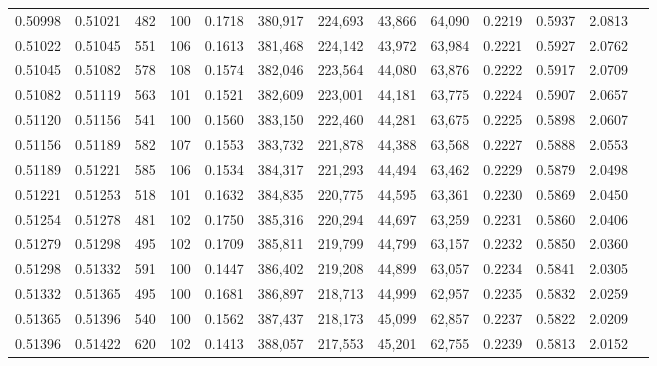 \begin{tabular}{rrrrrrrrrrrrr}
0.50998 & 0.51021 &   482 & 100 &                                     0.1718 & 380,917 & 224,693 &  43,866 &  64,090 & 0.2219 & 0.5937 & 2.0813 \\
0.51022 & 0.51045 &   551 & 106 &                                     0.1613 & 381,468 & 224,142 &  43,972 &  63,984 & 0.2221 & 0.5927 & 2.0762 \\
0.51045 & 0.51082 &   578 & 108 &                                     0.1574 & 382,046 & 223,564 &  44,080 &  63,876 & 0.2222 & 0.5917 & 2.0709 \\
0.51082 & 0.51119 &   563 & 101 &                                     0.1521 & 382,609 & 223,001 &  44,181 &  63,775 & 0.2224 & 0.5907 & 2.0657 \\
0.51120 & 0.51156 &   541 & 100 &                                     0.1560 & 383,150 & 222,460 &  44,281 &  63,675 & 0.2225 & 0.5898 & 2.0607 \\
0.51156 & 0.51189 &   582 & 107 &                                     0.1553 & 383,732 & 221,878 &  44,388 &  63,568 & 0.2227 & 0.5888 & 2.0553 \\
0.51189 & 0.51221 &   585 & 106 &                                     0.1534 & 384,317 & 221,293 &  44,494 &  63,462 & 0.2229 & 0.5879 & 2.0498 \\
0.51221 & 0.51253 &   518 & 101 &                                     0.1632 & 384,835 & 220,775 &  44,595 &  63,361 & 0.2230 & 0.5869 & 2.0450 \\
0.51254 & 0.51278 &   481 & 102 &                                     0.1750 & 385,316 & 220,294 &  44,697 &  63,259 & 0.2231 & 0.5860 & 2.0406 \\
0.51279 & 0.51298 &   495 & 102 &                                     0.1709 & 385,811 & 219,799 &  44,799 &  63,157 & 0.2232 & 0.5850 & 2.0360 \\
0.51298 & 0.51332 &   591 & 100 &                                     0.1447 & 386,402 & 219,208 &  44,899 &  63,057 & 0.2234 & 0.5841 & 2.0305 \\
0.51332 & 0.51365 &   495 & 100 &                                     0.1681 & 386,897 & 218,713 &  44,999 &  62,957 & 0.2235 & 0.5832 & 2.0259 \\
0.51365 & 0.51396 &   540 & 100 &                                     0.1562 & 387,437 & 218,173 &  45,099 &  62,857 & 0.2237 & 0.5822 & 2.0209 \\
0.51396 & 0.51422 &   620 & 102 &                                     0.1413 & 388,057 & 217,553 &  45,201 &  62,755 & 0.2239 & 0.5813 & 2.0152 \\

\end{tabular}
